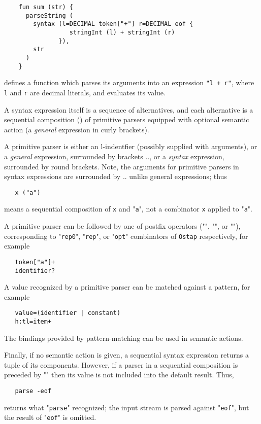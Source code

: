 \begin{lstlisting}
    fun sum (str) {
      parseString (
        syntax (l=DECIMAL token["+"] r=DECIMAL eof {
                  stringInt (l) + stringInt (r)
               }),
        str
      )
    }
\end{lstlisting}

defines a function which parses its arguments into an expression \lstinline|"l + r"|, where \lstinline|l| and \lstinline|r| are decimal literals, and evaluates its value.

A syntax expression itself is a sequence of alternatives, and each alternative is a sequential composition () of primitive parsers equipped with optional
semantic action (a \emph{general} expression in curly brackets).

A primitive parser is either an l-indentfier (possibly supplied with arguments), or a \emph{general} expression, surrounded by brackets \term{\$(}..\term{)},
or a \emph{syntax} expression, surrounded by round brackets. Note, the arguments for primitive parsers in syntax expressions are surrounded by
\term{[}..\term{]} unlike general expressions; thus

\begin{lstlisting}
   x ("a")
\end{lstlisting}

means a sequential composition of \lstinline|x| and "\lstinline|a|", not a combinator \lstinline|x| applied to "\lstinline|a|". 

A primitive parser can be followed by one of postfix operators ("\term{*}", "\term{+}", or ""), corresponding
to "\lstinline|rep0|",  "\lstinline|rep|", or "\lstinline|opt|" combinators of \lstinline|Ostap| respectively, for example

\begin{lstlisting}
   token["a"]+
   identifier? 
\end{lstlisting}

A value recognized by a primitive parser can be matched against a pattern, for example

\begin{lstlisting}
   value=(identifier | constant)
   h:tl=item+
\end{lstlisting}

The bindings provided by pattern-matching can be used in semantic actions.

Finally, if no semantic action is given, a sequential syntax expression returns a tuple of its components. However, if a parser
in a sequential composition is preceded by "\term{-}" then its value is not included into the default result. Thus,

\begin{lstlisting}
   parse -eof
\end{lstlisting}

returns what "\lstinline|parse|" recognized; the input stream is parsed against "\lstinline|eof|", but the result of "\lstinline|eof|"
is omitted.
